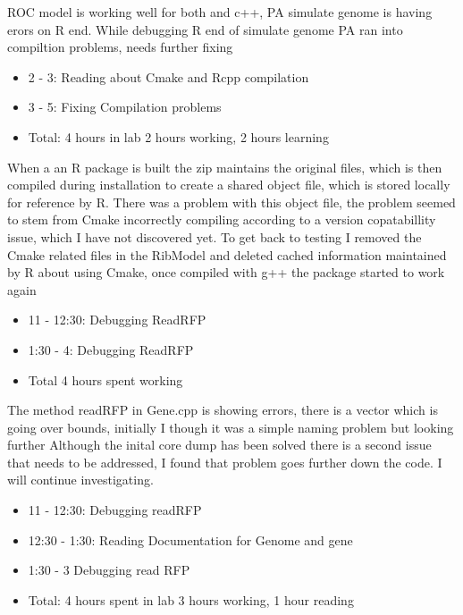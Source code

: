 \documentclass[12pt,hyperref]{labbook}
\begin{document}
ROC model is working well for both and c++, PA simulate genome is having erors on R end.
While debugging R end of simulate genome PA ran into compiltion problems, needs further fixing
\begin{itemize}
    \item 2 - 3: Reading about Cmake and Rcpp compilation
    \item 3 - 5: Fixing Compilation problems
    \item Total: 4 hours in lab 2 hours working, 2 hours learning
\end{itemize}
When a an R package is built the zip maintains the original files, which is then compiled during installation to create a shared object file, which is stored locally for reference by R. There was a problem with this object file, the problem seemed to stem from Cmake incorrectly compiling according to a version copatabillity issue, which I have not discovered yet.
To get back to testing I removed the Cmake related files in the RibModel and deleted cached information maintained by R about using Cmake, once compiled with g++ the package started to work again
\begin{itemize}
    \item 11 - 12:30: Debugging ReadRFP
    \item 1:30 - 4: Debugging ReadRFP
    \item Total 4 hours spent working
\end{itemize}
The method readRFP in Gene.cpp is showing errors, there is a vector which is going over bounds, initially I though it was a simple naming problem but looking further Although the inital core dump has been solved there is a second issue that needs to be addressed, I found that problem goes further down the code. I will continue investigating.
\begin{itemize}
    \item 11 - 12:30: Debugging readRFP
    \item 12:30 - 1:30: Reading Documentation for Genome and gene
    \item 1:30 - 3 Debugging read RFP
    \item Total: 4 hours spent in lab 3 hours working, 1 hour reading
\end{itemize}
\end{document}
